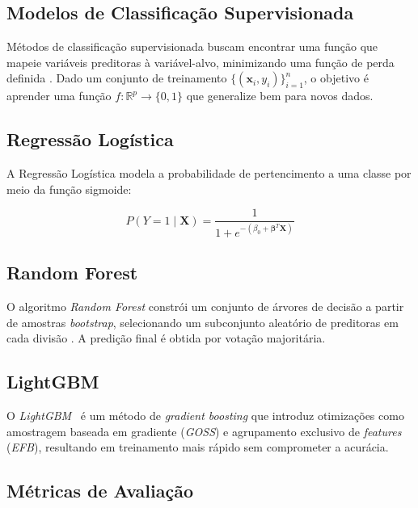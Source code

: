 \documentclass[
    article,
    12pt,
    oneside,
    a4paper,
    english,
    brazilian
    ]{abntex2}
\numberwithin{equation}{section}
\begin{document}
\subsection{Modelos de Classificação Supervisionada}

Métodos de classificação supervisionada buscam encontrar uma função que mapeie variáveis preditoras à variável-alvo, minimizando uma função de perda definida \cite{hastie2009}. Dado um conjunto de treinamento $\{(\mathbf{x}_i, y_i)\}_{i=1}^n$, o objetivo é aprender uma função $f: \mathbb{R}^p \to \{0,1\}$ que generalize bem para novos dados.

\subsection{Regressão Logística}

A Regressão Logística modela a probabilidade de pertencimento a uma classe por meio da função sigmoide:

\begin{equation}
    P(Y = 1 \mid \mathbf{X}) = \frac{1}{1 + e^{-(\beta_0 + \boldsymbol{\beta}^T \mathbf{X})}}
    \label{eq:logistic}
\end{equation}

\subsection{Random Forest}

O algoritmo \textit{Random Forest} constrói um conjunto de árvores de decisão a partir de amostras \textit{bootstrap}, selecionando um subconjunto aleatório de preditoras em cada divisão \cite{breiman2001}. A predição final é obtida por votação majoritária.

\subsection{LightGBM}

O \textit{LightGBM}~\cite{ke2017lightgbm} é um método de \textit{gradient boosting} que introduz otimizações como amostragem baseada em gradiente (\textit{GOSS}) e agrupamento exclusivo de \textit{features} (\textit{EFB}), resultando em treinamento mais rápido sem comprometer a acurácia.

\subsection{Métricas de Avaliação}
\end{document}
